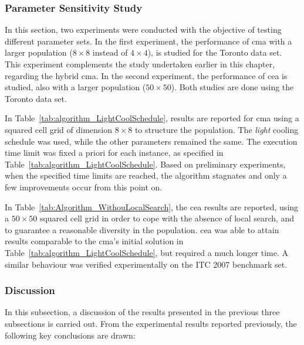 %
%
\subsubsection{Parameter Sensitivity Study}
\label{sec:ParameterSensitivityStudy}

In this section, two experiments were conducted with the objective of testing different parameter sets. In the first experiment, the performance of \gls{cma} with a larger population ($8 \times 8$ instead of $4 \times 4$), is studied for the Toronto data set. This experiment complements the study undertaken earlier in this chapter, regarding the hybrid \gls{cma}. In the second experiment, the performance of \gls{cea} is studied, also with a larger population ($50 \times 50$). Both studies are done using the Toronto data set. 

In Table~\ref{tab:algorithm_LightCoolSchedule}, results are reported for \gls{cma} using a squared cell grid of dimension $8 \times 8$ to structure the population. The \textit{light} cooling schedule was used, while the other parameters remained the same. The execution time limit was fixed a priori for each instance, as specified in Table~\ref{tab:algorithm_LightCoolSchedule}. Based on preliminary experiments, when the specified time limits are reached, the algorithm stagnates and only a few improvements occur from this point on.

In Table~\ref{tab:Algorithm_WithouLocalSearch}, the \gls{cea} results are reported, using a $50 \times 50$ squared cell grid in order to cope with the absence of local search, and to guarantee a reasonable diversity in the population. \gls{cea} was able to attain results comparable to the \gls{cma}'s initial solution in Table~\ref{tab:algorithm_LightCoolSchedule}, but required a much longer time. A similar behaviour was verified experimentally on the ITC 2007 benchmark set.


\subsubsection{Discussion}

In this subsection, a discussion of the results presented in the previous three subsections is carried out. From the experimental results reported previously, the following key conclusions are drawn:


